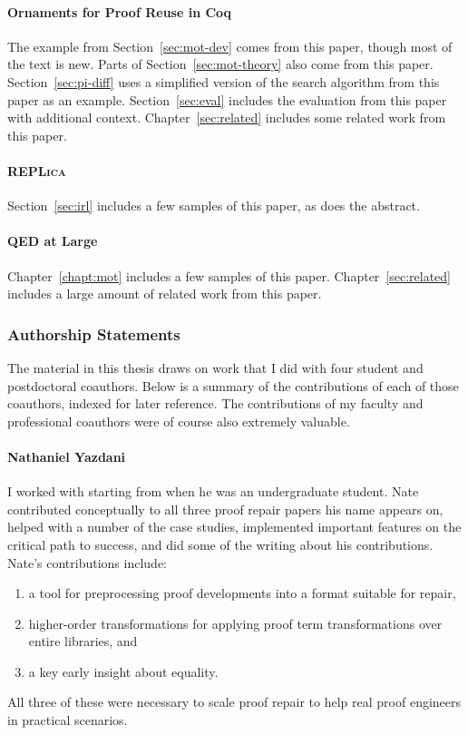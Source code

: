 \paragraph{Ornaments for Proof Reuse in Coq}
The example from Section~\ref{sec:mot-dev} comes from this paper, though most of the text is new.
Parts of Section~\ref{sec:mot-theory} also come from this paper.
Section~\ref{sec:pi-diff} uses a simplified version of the search algorithm from this paper as an example.
Section~\ref{sec:eval} includes the evaluation from this paper with additional context.
Chapter~\ref{sec:related} includes some related work from this paper.

\paragraph{\textsc{REPLica}}
Section~\ref{sec:irl} includes a few samples of this paper, as does the abstract.

\paragraph{QED at Large}
Chapter~\ref{chapt:mot} includes a few samples of this paper.
Chapter~\ref{sec:related} includes a large amount of related work from this paper.

\subsubsection*{Authorship Statements}

The material in this thesis draws on work that I did with four student and postdoctoral coauthors.
Below is a summary of the contributions of each of those coauthors,
indexed for later reference.
The contributions of my faculty and professional coauthors were of course also extremely valuable.

\paragraph{Nathaniel Yazdani}
I worked with  starting from when he was an undergraduate student.
Nate contributed conceptually to all three proof repair papers his name appears on,
helped with a number of the case studies,
implemented important features on the critical path to success,
and did some of the writing about his contributions.
Nate's contributions include:

\begin{enumerate}
\item a tool for preprocessing proof developments into a format suitable for repair,
\item higher-order transformations for applying proof term transformations over entire libraries, and
\item a key early insight about equality.
\end{enumerate}
All three of these were necessary to scale proof repair to help real proof engineers in practical scenarios.

